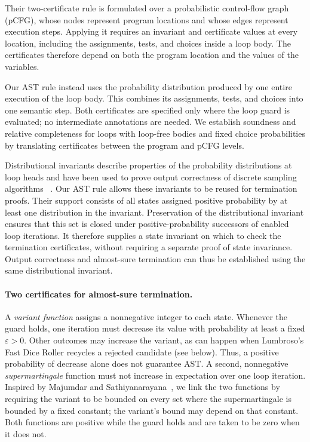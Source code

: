 Their two-certificate rule is formulated over a probabilistic control-flow
graph (pCFG), whose nodes represent program locations and whose edges
represent execution steps. Applying it requires an invariant and
certificate values at every location, including the assignments, tests,
and choices inside a loop body. The certificates therefore depend on
both the program location and the values of the variables.

Our AST rule instead uses the probability distribution produced by one
entire execution of the loop body. This combines its assignments, tests,
and choices into one semantic step. Both certificates are specified only
where the loop guard is evaluated; no intermediate annotations are needed.
We establish soundness and relative completeness for loops with loop-free
bodies and fixed choice probabilities by translating certificates between
the program and pCFG levels.

Distributional invariants describe properties of the probability
distributions at loop heads and have been used to prove output correctness
of discrete sampling algorithms%
~\cite{zilken2026verifyingsamplingalgorithmsdistributional}.
Our AST rule allows these invariants to be reused for termination proofs.
Their support consists of all states assigned positive probability by
at least one distribution in the invariant. Preservation of the
distributional invariant ensures that this set is closed under
positive-probability successors of enabled loop iterations.
It therefore supplies a state invariant on which to check the
termination certificates, without requiring a separate proof of
state invariance. Output correctness and almost-sure termination
can thus be established using the same distributional invariant.

\paragraph{Two certificates for almost-sure termination.}
A \emph{variant function} assigns a nonnegative integer to each state.
Whenever the guard holds, one iteration must decrease its value with
probability at least a fixed $\varepsilon>0$.
Other outcomes may increase the variant, as can happen when
Lumbroso's Fast Dice Roller recycles a rejected candidate (see below).
Thus, a positive probability of decrease alone does not guarantee AST.
A second, nonnegative \emph{supermartingale} function must not increase
in expectation over one loop iteration.
Inspired by Majumdar and
Sathiyanarayana~\cite{DBLP:journals/pacmpl/MajumdarS25},
we link the two functions by requiring the variant to be bounded
on every set where the supermartingale is bounded by a fixed constant;
the variant's bound may depend on that constant.
Both functions are positive while the guard holds and are taken
to be zero when it does not.

